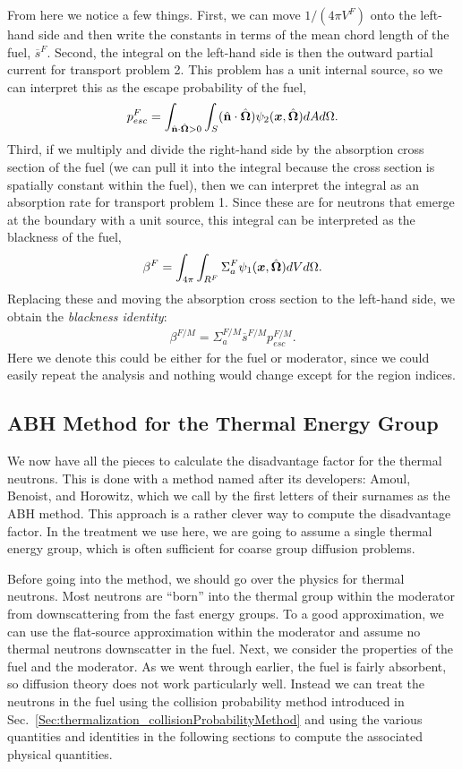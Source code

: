 From here we notice a few things. First, we can move $1/(4\pi V^F)$ onto the left-hand side and then write the constants in terms of the mean chord length of the fuel, $\overline{s}^F$. Second, the integral on the left-hand side is then the outward partial current for transport problem 2. This problem has a unit internal source, so we can interpret this as the escape probability of the fuel,
\begin{align}
  p_{esc}^F = \int_{\hat{\mathbf{n}} \cdot \hat{\mathbf{\Omega}} > 0} \int_{S} ( \hat{\mathbf{n}} \cdot \hat{\mathbf{\Omega}} ) \psi_2(\bm{x},\hat{\mathbf{\Omega}}) dA d\Omega . 
\end{align}
Third, if we multiply and divide the right-hand side by the absorption cross section of the fuel (we can pull it into the integral because the cross section is spatially constant within the fuel), then we can interpret the integral as an absorption rate for transport problem 1. Since these are for neutrons that emerge at the boundary with a unit source, this integral can be interpreted as the blackness of the fuel,
\begin{align}
  \beta^F =  \int_{4\pi} \int_{R^F} \Sigma_a^F  \psi_1(\bm{x},\hat{\mathbf{\Omega}})  dV d\Omega .
\end{align}
Replacing these and moving the absorption cross section to the left-hand side, we obtain the \emph{blackness identity}:
\begin{align}
  \beta^{F/M} = \Sigma_a^{F/M} \overline{s}^{F/M} p_{esc}^{F/M} . \label{Eq:thermalization_blacknessIdentity}
\end{align}
Here we denote this could be either for the fuel or moderator, since we could easily repeat the analysis and nothing would change except for the region indices. 

\subsection{ABH Method for the Thermal Energy Group}

We now have all the pieces to calculate the disadvantage factor for the thermal neutrons. This is done with a method named after its developers: Amoul, Benoist, and Horowitz, which we call by the first letters of their surnames as the ABH method. This approach is a rather clever way to compute the disadvantage factor. In the treatment we use here, we are going to assume a single thermal energy group, which is often sufficient for coarse group diffusion problems.

Before going into the method, we should go over the physics for thermal neutrons. Most neutrons are ``born'' into the thermal group within the moderator from downscattering from the fast energy groups. To a good approximation, we can use the flat-source approximation within the moderator and assume no thermal neutrons downscatter in the fuel. Next, we consider the properties of the fuel and the moderator. As we went through earlier, the fuel is fairly absorbent, so diffusion theory does not work particularly well. Instead we can treat the neutrons in the fuel using the collision probability method introduced in Sec.~\ref{Sec:thermalization_collisionProbabilityMethod} and using the various quantities and identities in the following sections to compute the associated physical quantities. 


